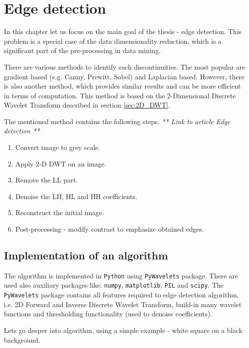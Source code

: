 \chapter{Edge detection} 

In this chapter let us focus on the main goal of the thesis - edge detection. This problem is a special case of the data dimensionality reduction, which is a significant part of the pre-processing in data mining.


There are various methods to identify such discontinuities. The most popular are gradient based (e.g. Canny, Prewitt, Sobel) and Laplacian based. However, there is also another method, which provides similar results and can be more efficient in terms of computation. This method is based on the 2-Dimensional Discrete Wavelet Transform described in section \ref{sec:2D_DWT}. \newline

The mentioned method contains the following steps. \textit{** Link to article Edge detection **}
\begin{enumerate}
\item Convert image to grey scale.
\item Apply 2-D DWT on an image.
\item Remove the LL part.
\item Denoise the LH, HL and HH coefficients.
\item Reconstruct the initial image.
\item Post-processing - modify contrast to emphasize obtained edges.
\end{enumerate}

\section{Implementation of an algorithm}
\label{sec:implementation}

The algorithm is implemented in \texttt{Python} using \texttt{PyWavelets} package. There are used also auxiliary packages like: \texttt{numpy}, \texttt{matplotlib}, \texttt{PIL} and \texttt{scipy}. The \texttt{PyWavelets} package contains all features required to edge detection algorithm, i.e. 2D Forward and Inverse Discrete Wavelet Transform, build-in many wavelet functions and thresholding functionality (used to denoise coefficients).

Lets go deeper into algorithm, using a simple example - white square on a black background.

